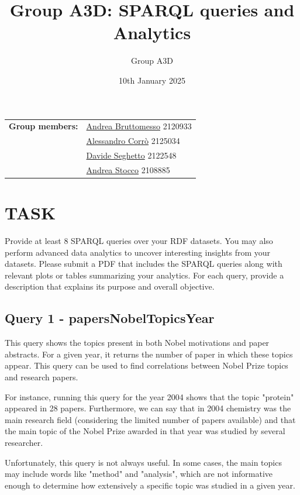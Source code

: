 \documentclass{article}
\title{Group A3D: SPARQL queries and Analytics}
\author{Group A3D}
\date{10th January 2025}
\begin{document}
\maketitle

\begin{tabular}{@{}ll}
	\textbf{Group members:}
	 & \href{mailto:andrea.bruttomesso.1@studenti.unipd.it}{Andrea Bruttomesso} 2120933 \\
	 & \href{mailto:alessandro.corro.1@studenti.unipd.it}{Alessandro Corr\`o} 2125034   \\
	 & \href{mailto:davide.seghetto@studenti.unipd.it}{Davide Seghetto} 2122548         \\
	 & \href{mailto:andrea.stocco.8@studenti.unipd.it}{Andrea Stocco} 2108885           \\
\end{tabular}


\section*{TASK}
Provide at least 8 SPARQL queries over your RDF datasets. You may also perform advanced data analytics to uncover interesting insights from your datasets. Please submit a PDF that includes the SPARQL queries along with relevant plots or tables summarizing your analytics. For each query, provide a description that explains its purpose and overall objective.

\subsection*{Query 1 - papersNobelTopicsYear}
This query shows the topics present in both Nobel motivations and paper abstracts.
For a given year, it returns the number of paper in which these topics appear.
This query can be used to find correlations between Nobel Prize topics and research
papers.

For instance, running this query for the year 2004 shows that the topic "protein"
appeared in 28 papers. Furthermore, we can say that in 2004 chemistry was the main
research field (considering the limited number of papers available) and that the
main topic of the Nobel Prize awarded in that year was studied by several
researcher.

Unfortunately, this query is not always useful. In some cases, the
main topics may include words like "method" and "analysis", which are not
informative enough to determine how extensively a specific topic was studied
in a given year.
\end{document}
